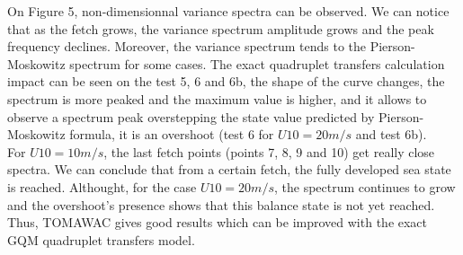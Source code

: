 \documentclass[10pt]{article}
\begin{document}
On Figure 5, non-dimensionnal variance spectra can be observed. We can notice
that as the fetch grows, the variance spectrum amplitude grows and the peak
frequency declines. Moreover, the variance spectrum tends to the
Pierson-Moskowitz spectrum for some cases. The exact quadruplet transfers
calculation impact can be seen on the test 5, 6 and 6b, the shape of the curve
changes, the spectrum is more peaked and the maximum value is higher, and it
allows to observe a spectrum peak overstepping the state value predicted by
Pierson-Moskowitz formula, it is an overshoot (test 6 for $U10 = 20m/s$ and
test 6b).\\
For $U10 = 10m/s$, the last fetch points (points 7, 8, 9 and 10) get really
close spectra. We can conclude that from a certain fetch, the fully developed
sea state is reached. Althought, for the case $U10 = 20m/s$, the spectrum
continues to grow and the overshoot's presence shows that this balance state
is not yet reached. Thus, TOMAWAC gives good results which can be improved with
the exact GQM quadruplet transfers model.
\end{document}
